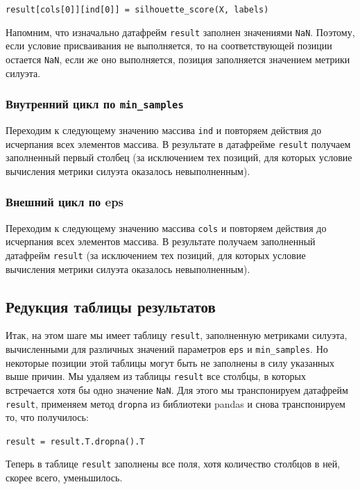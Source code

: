 \documentclass[a4paper,12pt]{article}
\begin{document}
\medskip\noindent
\texttt{result[cols[0]][ind[0]] = silhouette\_score(X, labels)}

\medskip\noindent
Напомним, что изначально датафрейм \texttt{result} заполнен значениями \texttt{NaN}. Поэтому, если условие присваивания не выполняется, то на соответствующей позиции остается \texttt{NaN}, если же оно выполняется, позиция заполняется значением метрики силуэта.

\subsubsection{Внутренний цикл по \texttt{min\_samples}}

Переходим к следующему значению массива \texttt{ind} и повторяем действия до исчерпания всех элементов массива. В результате в датафрейме \texttt{result} получаем заполненный первый столбец (за исключением тех позиций, для которых условие вычисления метрики силуэта оказалось невыполненным).

\subsubsection{Внешний цикл по eps}

Переходим к следующему значению массива \texttt{cols} и повторяем действия до исчерпания всех элементов массива. В результате получаем заполненный датафрейм \texttt{result} (за исключением тех позиций, для которых условие вычисления метрики силуэта оказалось невыполненным).


\subsection{Редукция таблицы результатов}


Итак, на этом шаге мы имеет таблицу \texttt{result}, заполненную метриками силуэта, вычисленными для различных значений параметров \texttt{eps} и \texttt{min\_samples}. Но некоторые позиции этой таблицы могут быть не заполнены в силу указанных выше причин. Мы удаляем из таблицы \texttt{result} все столбцы, в которых встречается хотя бы одно значение \texttt{NaN}. Для этого мы транспонируем датафрейм \texttt{result}, применяем метод \texttt{dropna} из библиотеки pandas и снова транспонируем то, что получилось:

\medskip\noindent
\texttt{result = result.T.dropna().T}

\medskip\noindent
Теперь в таблице \texttt{result} заполнены все поля, хотя количество столбцов в ней, скорее всего, уменьшилось.
\end{document}
